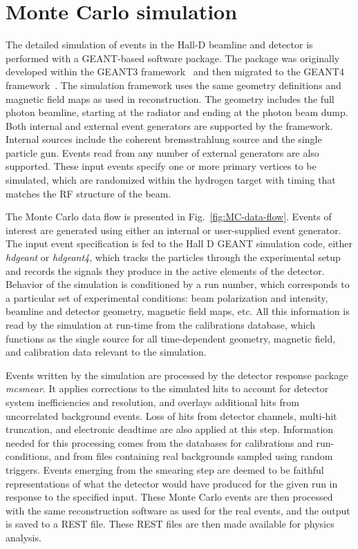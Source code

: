 \section[Monte Carlo]{Monte Carlo simulation \label{sec:simulation}}
The detailed simulation of events in the Hall-D beamline and \gx{} detector is performed with a GEANT-based software package. The package was originally developed within the GEANT3 framework~\cite{Brun:1987ma} and then migrated to the GEANT4 framework~\cite{Agostinelli:2002hh,Allison:2016lfl}. The simulation framework uses the same geometry definitions and magnetic field maps as used in reconstruction. The geometry includes the full photon beamline, starting at the radiator and ending at the photon beam dump. Both internal and external event generators are supported by the framework.  Internal sources include the coherent bremsstrahlung source and the single particle gun. Events read from any number of external generators are also supported. These input events specify one or more primary vertices to be simulated, which are randomized within the hydrogen target with timing that matches the RF structure of the beam.

The Monte Carlo data flow is presented in Fig.~\ref{fig:MC-data-flow}. Events of interest are generated using either an internal or user-supplied event generator. The input event specification is fed to the Hall D GEANT simulation code, either {\em hdgeant} or {\em hdgeant4}, which tracks the particles through the experimental setup and records the signals they produce in the active elements of the detector. Behavior of the simulation is conditioned by a run number, which corresponds to a particular set of experimental conditions: beam polarization and intensity, beamline and detector geometry, magnetic field maps, etc. All this information is read by the simulation at run-time from the calibrations database, which functions as the single source for all time-dependent geometry, magnetic field, and calibration data relevant to the simulation.

Events written by the simulation are processed by the detector response package {\em mcsmear}. It applies corrections to the simulated hits to account for detector system inefficiencies and resolution, and overlays additional hits from uncorrelated background events. Loss of hits from detector channels, multi-hit truncation, and electronic deadtime are also applied at this step. Information needed for this processing comes from the databases for calibrations and run-conditions, and from files containing real backgrounds sampled using random triggers. Events emerging from the smearing step are deemed to be faithful representations of what the detector would have produced for the given run in response to the specified input. These Monte Carlo events are then processed with the same reconstruction software as used for the real events, and the output is saved to a REST file. These REST files are then made available for physics analysis.

